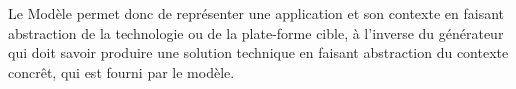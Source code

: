 Le Modèle permet donc de représenter une application et son contexte en faisant abstraction de la technologie ou de la plate-forme cible, à l'inverse du générateur qui doit savoir produire une solution technique en faisant abstraction du contexte concrêt, qui est fourni par le modèle.




